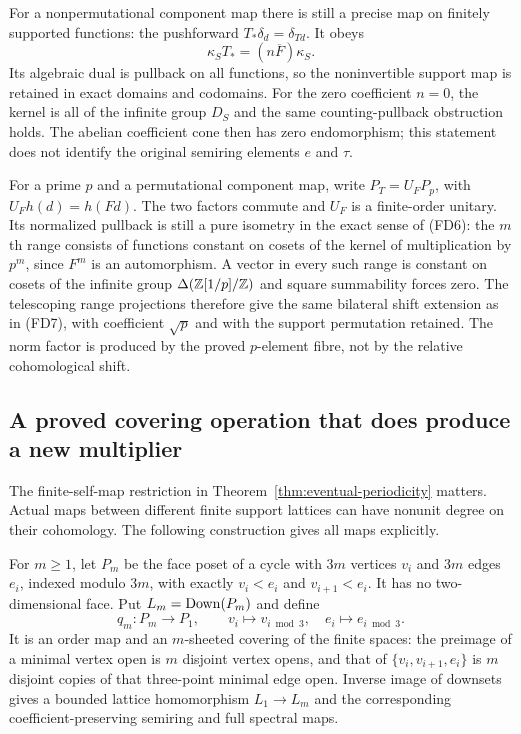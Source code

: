 For a nonpermutational component map there is still a precise map
on finitely supported functions: the pushforward
$T_*\delta_d=\delta_{Td}$. It obeys
\[
 \kappa_ST_*=(n\overline F)\kappa_S.
 \tag{SE28}\label{eq:pushforward-all-maps}
\]
Its algebraic dual is pullback on all functions, so the noninvertible
support map is retained in exact domains and codomains. For the
zero coefficient $n=0$, the kernel is all of the infinite group
$D_S$ and the same counting-pullback obstruction holds. The abelian
coefficient cone then has zero endomorphism; this statement does
not identify the original semiring elements $e$ and $\tau$.

For a prime $p$ and a permutational component map, write
$P_T=U_F P_p$, with $U_Fh(d)=h(Fd)$. The two factors commute and
$U_F$ is a finite-order unitary. Its normalized pullback is still
a pure isometry in the exact sense of (FD6): the $m$th range consists
of functions constant on cosets of the kernel of multiplication by
$p^m$, since $F^m$ is an automorphism. A vector in every such range
is constant on cosets of the infinite group
$\Delta(\mathbb Z[1/p]/\mathbb Z)$ and square summability forces zero. The
telescoping range projections therefore give the same bilateral
shift extension as in (FD7), with coefficient $\sqrt p$ and with
the support permutation retained. The norm factor is produced by
the proved $p$-element fibre, not by the relative cohomological shift.

\subsection{A proved covering operation that does produce a new multiplier}

The finite-self-map restriction in
Theorem~\ref{thm:eventual-periodicity} matters. Actual maps between
different finite support lattices can have nonunit degree on their
cohomology. The following construction gives all maps explicitly.

For $m\ge1$, let $P_m$ be the face poset of a cycle with $3m$ vertices
$v_i$ and $3m$ edges $e_i$, indexed modulo $3m$, with exactly
$v_i<e_i$ and $v_{i+1}<e_i$. It has no two-dimensional face. Put
$L_m=\operatorname{Down}(P_m)$ and define
\[
 q_m:P_m\to P_1,\qquad v_i\mapsto v_{i\bmod3},\quad
 e_i\mapsto e_{i\bmod3}.
 \tag{SE29}\label{eq:cycle-cover}
\]
It is an order map and an $m$-sheeted covering of the finite spaces:
the preimage of a minimal vertex open is $m$ disjoint vertex opens,
and that of $\{v_i,v_{i+1},e_i\}$ is $m$ disjoint copies of that
three-point minimal edge open. Inverse image of downsets gives a
bounded lattice homomorphism $L_1\to L_m$ and the corresponding
coefficient-preserving semiring and full spectral maps.

